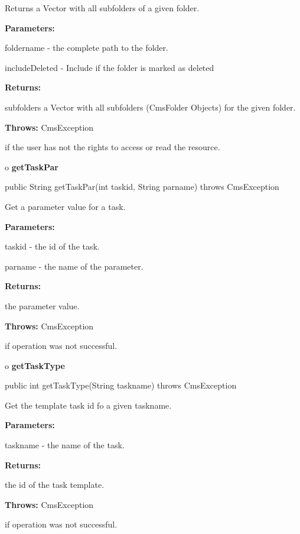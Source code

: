 \begin{description}
\htmlDD Returns a Vector with all subfolders of a given folder. 

\begin{description}
\item {\bf Parameters:}  

foldername - the complete path to the folder.  

includeDeleted - Include if the folder is marked as deleted  
\item {\bf Returns:}  

subfolders a Vector with all subfolders (CmsFolder Objects) for the given
folder.  
\item {\bf Throws:} CmsException  

if the user has not the rights to access or read the resource.  
\end{description}

\end{description}

o {\bf getTaskPar} 

\begin{PRE}
 public String getTaskPar(int taskid,
                          String parname) throws CmsException
\end{PRE}

\begin{description}
\htmlDD Get a parameter value for a task. 

\begin{description}
\item {\bf Parameters:}  

taskid - the id of the task.  

parname - the name of the parameter.  
\item {\bf Returns:}  

the parameter value.  
\item {\bf Throws:} CmsException  

if operation was not successful.  
\end{description}

\end{description}

o {\bf getTaskType} 

\begin{PRE}
 public int getTaskType(String taskname) throws CmsException
\end{PRE}

\begin{description}
\htmlDD Get the template task id fo a given taskname. 

\begin{description}
\item {\bf Parameters:}  

taskname - the name of the task.  
\item {\bf Returns:}  

the id of the task template.  
\item {\bf Throws:} CmsException  

if operation was not successful.  
\end{description}

\end{description}

